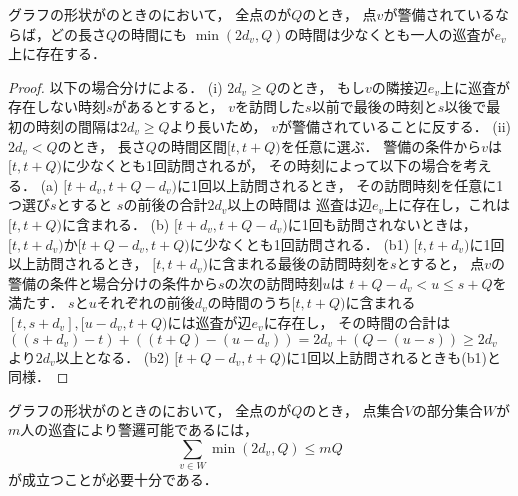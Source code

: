 \begin{lemm}
\label{lemm:star_cost_of_vertex}
グラフの形状が{\graphStar}のときの{\patProb}において，
全点の{\maxIdletime}が$Q$のとき，
点$v$が警備されているならば，どの長さ$Q$の時間にも
$\min(2d_v, Q)$の時間は少なくとも一人の巡査が$e_v$上に存在する．
\end{lemm}
\begin{proof}
以下の場合分けによる．
(i) $2d_v \geq Q$のとき，
もし$v$の隣接辺$e_v$上に巡査が存在しない時刻$s$があるとすると，
$v$を訪問した$s$以前で最後の時刻と$s$以後で最初の時刻の間隔は$2d_v \geq Q$より長いため，
$v$が警備されていることに反する．
%
(ii) $2d_v < Q$のとき，
長さ$Q$の時間区間$[t, t + Q)$を任意に選ぶ．
警備の条件から$v$は$[t, t + Q)$に少なくとも1回訪問されるが，
その時刻によって以下の場合を考える．
%
(a) $[t + d_v, t + Q - d_v)$に1回以上訪問されるとき，
その訪問時刻を任意に1つ選び$s$とすると
$s$の前後の合計$2d_v$以上の時間は
巡査は辺$e_v$上に存在し，これは$[t, t + Q)$に含まれる．
%
(b) $[t + d_v, t + Q - d_v)$に1回も訪問されないときは，
$[t, t + d_v)$か$[t + Q - d_v, t + Q)$に少なくとも1回訪問される．
(b1) $[t, t + d_v)$に1回以上訪問されるとき，
$[t, t + d_v)$に含まれる最後の訪問時刻を$s$とすると，
点$v$の警備の条件と場合分けの条件から$s$の次の訪問時刻$u$は
$t + Q - d_v < u \leq s + Q$を満たす．
$s$と$u$それぞれの前後$d_v$の時間のうち$[t, t + Q)$に含まれる
$[t, s + d_v], [u - d_v, t + Q)$には巡査が辺$e_v$に存在し，
その時間の合計は
$((s + d_v) - t) + ((t + Q) - (u - d_v)) = 2d_v + (Q - (u - s)) \geq 2d_v$
より$2d_v$以上となる．
(b2) $[t + Q - d_v, t + Q)$に1回以上訪問されるときも(b1)と同様．
\end{proof}



\begin{lemm}
\label{lemm:condition_of_guarding_star}
グラフの形状が{\graphStar}のときの{\patProb}において，
全点の{\maxIdletime}が$Q$のとき，
点集合$V$の部分集合$W$が
$m$人の巡査により警邏可能であるには，
\begin{equation}
  \label{equation: star bound}
\sum_{v \in W} \min(2d_v, Q) \leq mQ
\end{equation}
が成立つことが必要十分である．
\end{lemm}

